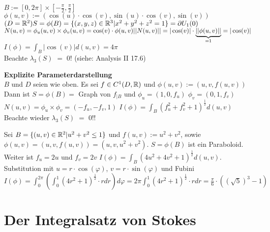 \documentclass[a4paper,twoside,DIV15,BCOR12mm]{scrbook}
\begin{document}
\begin{beispiele}
\item
$B := [0,2\pi] \times [-\frac\pi2, \frac\pi2]$ \\
$\phi(u,v) := (\cos(u)\cdot \cos(v), \sin(u)\cdot \cos(v), \sin(v))$  $(D = \mathbb{R}^2) \\
S = \phi(B) = \{ (x,y,z) \in \mathbb{R}^3 | x^2 +y^2 +z^2 = 1 \} = \partial U_1(0)$\\
$N(u,v) = \phi_u(u,v) \times \phi_v(u,v) = \cos(v)\cdot \phi(u,v) \\
|| N(u,v) || = | \cos (v) | \cdot  \underbrace{|| \phi(u,v) ||}_{=1} = | \cos(v) |$ \\
\folgt $I(\phi) = \int_{B} | \cos (v) | d(u,v) = 4\pi$ \\
Beachte $\lambda_3(S)$ $=$ $0$! (siehe: Analysis II 17.6)

\item \textbf{Explizite Parameterdarstellung} \\
$B$ und $D$ seien wie oben. Es sei $f \in C^1(D,\mathbb{R})$ und $\phi(u,v) := (u,v,f(u,v))$ \\
Dann ist $ S = \phi(B) = $ Graph von $f_{|B}$ und $\phi_u = (1,0,f_u)$ $\phi_v = (0,1,f_v)$ \folgt $N(u,v) = \phi_u \times \phi_v = (-f_u, -f_v, 1)$ \folgt $I(\phi) = \int_{B} (f_{u}^2 + f_{v}^2 +1)^{\frac12} d(u,v)$ \\
Beachte wieder $\lambda_3(S)$ $=$ $0$!!


\item
Sei $B = \{(u,v) \in \mathbb{R}^2 | u^2 + v^2 \le 1 \}$ und $f(u,v) := u^2  + v^2$, sowie $\phi(u,v) = (u,v, f(u,v)) = (u,v, u^2 + v^2)$.
$S = \phi(B)$ ist ein Paraboloid. Weiter ist $f_u = 2u$ und $f_v = 2v$ \folgt $I(\phi) = \int_{B} (4u^2+4v^2+1)^{\frac12} d(u,v)$. \\
Substitution mit $u = r\cdot \cos(\varphi)$, $v = r\cdot \sin(\varphi)$ und Fubini \folgt 
$I(\phi) = \int_{0}^{2\pi} ( \int_0^1 (4r^2 +1)^{\frac12}\cdot r dr) d \varphi = 2\pi \int_0^1 (4r^2 +1)^{\frac12}\cdot r dr = \frac\pi6 \cdot  ((\sqrt{5})^3-1)$

\end{beispiele}



\chapter{Der Integralsatz von Stokes}
\end{document}
